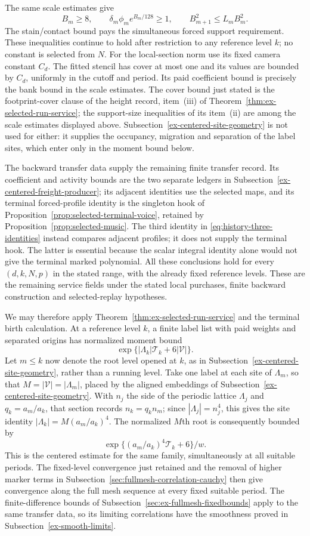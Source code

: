 The same scale estimates give
\[
 B_m\ge8,\qquad
 \delta_m\phi_m e^{B_m/128}\ge1,\qquad
 B_{m+1}^2\le L_mB_m^2.
\]
The stain/contact bound pays the simultaneous forced support
requirement. These inequalities continue to hold after restriction
to any reference level $k$; no constant is selected from $N$.
For the local-section norm use its fixed camera constant $C_d$.
The fitted stencil has cover at most one and its values are bounded
by $C_d$, uniformly in the cutoff and period. Its paid coefficient
bound is precisely the bank bound in the scale estimates. The
cover bound just stated is the footprint-cover clause of the height
record, item~(iii) of Theorem~\ref{thm:ex-selected-run-service}; the
support-size inequalities of its item~(ii) are among the scale
estimates displayed above. Subsection~\ref{ex-centered-site-geometry}
is not used for either: it supplies the occupancy, migration and
separation of the label sites, which enter only in the moment
bound below.

The backward transfer data supply the remaining finite transfer
record. Its coefficient and activity bounds are the two separate
ledgers in Subsection~\ref{ex-centered-freight-producer}; its adjacent
identities use the selected maps, and its terminal forced-profile
identity is the singleton hook of
Proposition~\ref{prop:selected-terminal-voice}, retained by
Proposition~\ref{prop:selected-music}. The third identity in
\eqref{eq:history-three-identities} instead compares adjacent profiles;
it does not supply the terminal hook. The latter is essential because
the scalar integral identity alone would not give the terminal
marked polynomial. All these conclusions hold for every $(d,k,N,p)$
in the stated range, with the already fixed reference levels.
These are the remaining service fields under the stated local purchases,
finite backward construction and selected-replay hypotheses.

We may therefore apply Theorem~\ref{thm:ex-selected-run-service}
and the terminal birth calculation. At a reference level $k$, a
finite label list with paid weights and separated origins has
normalized moment bound
\[
              \exp\{|\Lambda_k|\mathcal T_k+6|\mathcal V|\}.
\]
Let $m\le k$ now denote the root level opened at $k$, as in
Subsection~\ref{ex-centered-site-geometry}, rather than a running level.
Take one label at each site of $\Lambda_m$, so that
$M=|\mathcal V|=|\Lambda_m|$, placed by the aligned embeddings of
Subsection~\ref{ex-centered-site-geometry}. With $n_j$ the side of the
periodic lattice $\Lambda_j$ and $q_k=a_m/a_k$, that section records
$n_k=q_kn_m$; since $|\Lambda_j|=n_j^4$, this gives the site identity
$|\Lambda_k|=M(a_m/a_k)^4$.
The normalized $M$th root is consequently bounded by
\[
              \exp\{(a_m/a_k)^4\mathcal T_k+6\}/w.
\]
This is the centered estimate for the same family, simultaneously
at all suitable periods. The fixed-level convergence just retained
and the removal of higher marker terms in
Subsection~\ref{sec:fullmesh-correlation-cauchy} then give convergence
along the full mesh sequence at every fixed suitable period.
The finite-difference bounds of
Subsection~\ref{sec:ex-fullmesh-fixedbounds} apply to the same
transfer data, so its limiting correlations have the smoothness
proved in Subsection~\ref{ex-smooth-limits}.

